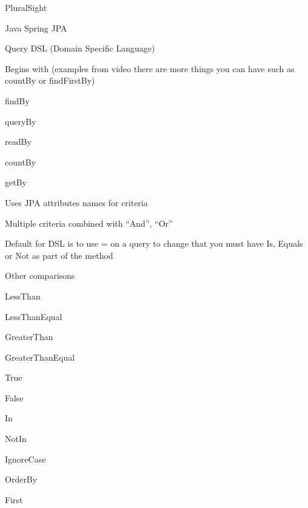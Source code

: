 \documentclass[presentation]{beamer}
\begin{document}
\begin{frame}[label={sec:org34d6546}]{PluralSight}
\begin{block}{Java Spring JPA}
\begin{block}{Query DSL (Domain Specific Language)}
\begin{block}{Begins with}
(examples from video there are more things you can have such as countBy or findFirstBy)
\begin{block}{findBy}
\end{block}
\begin{block}{queryBy}
\end{block}
\begin{block}{readBy}
\end{block}
\begin{block}{countBy}
\end{block}
\begin{block}{getBy}
\end{block}
\end{block}
\begin{block}{Uses JPA attributes names for criteria}
\end{block}
\begin{block}{Multiple criteria combined with ``And'', ``Or''}
\end{block}
\begin{block}{Default for DSL is to use = on a query}
to change that you must have Is, Equals or Not as part of the method
\end{block}
\begin{block}{Other comparisons}
\begin{block}{LessThan}
\end{block}
\begin{block}{LessThanEqual}
\end{block}
\begin{block}{GreaterThan}
\end{block}
\begin{block}{GreaterThanEqual}
\end{block}
\begin{block}{True}
\end{block}
\begin{block}{False}
\end{block}
\begin{block}{In}
\end{block}
\begin{block}{NotIn}
\end{block}
\begin{block}{IgnoreCase}
\end{block}
\begin{block}{OrderBy}
\end{block}
\begin{block}{First}
\end{block}

\end{block}
\end{block}
\end{block}
\end{frame}
\end{document}
